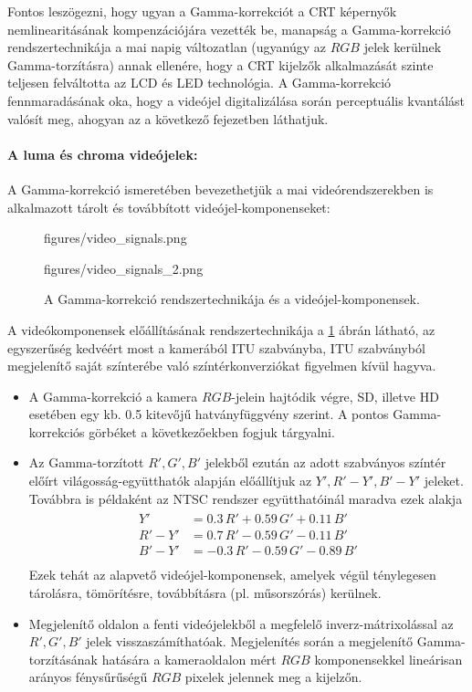 \hspace{3mm}
Fontos leszögezni, hogy ugyan a Gamma-korrekciót a CRT képernyők nemlinearitásának kompenzációjára vezették be, manapság a Gamma-korrekció rendszertechnikája a mai napig változatlan (ugyanúgy az $RGB$ jelek kerülnek Gamma-torzításra) annak ellenére, hogy a CRT kijelzők alkalmazását szinte teljesen felváltotta az LCD és LED technológia.
A Gamma-korrekció fennmaradásának oka, hogy a videójel digitalizálása során perceptuális kvantálást valósít meg, ahogyan az a következő fejezetben láthatjuk.

\paragraph{A luma és chroma videójelek:\\}
A Gamma-korrekció ismeretében bevezethetjük a mai videórendszerekben is alkalmazott tárolt és továbbított videójel-komponenseket:
\begin{figure}[]
	\centering
	\begin{overpic}[width = 0.53\columnwidth ]{figures/video_signals.png}
	\end{overpic}
	\hspace{2mm}
	\begin{overpic}[width = 0.44\columnwidth ]{figures/video_signals_2.png}
	\end{overpic}
	\caption{A Gamma-korrekció rendszertechnikája és a videójel-komponensek.}
	\label{Fig:gamma_system}  
\end{figure}
A videókomponensek előállításának rendszertechnikája a \ref{Fig:gamma_system} ábrán látható, az egyszerűség kedvéért most a kamerából ITU szabványba, ITU szabványból megjelenítő saját színterébe való színtérkonverziókat figyelmen kívül hagyva.
\begin{itemize}
\item A Gamma-korrekció a kamera $RGB$-jelein hajtódik végre, SD, illetve HD esetében egy kb. 0.5 kitevőjű hatványfüggvény szerint.
A pontos Gamma-korrekciós görbéket a következőekben fogjuk tárgyalni.
\item Az Gamma-torzított $R',G',B'$ jelekből ezután az adott szabványos színtér előírt világosság-együtthatók alapján előállítjuk az $Y', R'-Y', B'-Y'$ jeleket.
Továbbra is példaként az NTSC rendszer együtthatóinál maradva ezek alakja
\begin{align}
\begin{split}
Y' &= 0.3 \, R' + 0.59 \, G' + 0.11 \, B' \\
R'-Y' &= 0.7 \, R' - 0.59 \, G' - 0.11 \, B' \\
B'-Y' &= -0.3 \, R' - 0.59 \, G' - 0.89 \, B' \\
\end{split}
\end{align}
Ezek tehát az alapvető videójel-komponensek, amelyek végül ténylegesen tárolásra, tömörítésre, továbbításra (pl. műsorszórás) kerülnek.
\item Megjelenítő oldalon a fenti videójelekből a megfelelő inverz-mátrixolással az $R', G', B'$ jelek visszaszámíthatóak.
Megjelenítés során a megjelenítő Gamma-torzításának hatására a kameraoldalon mért $RGB$ komponensekkel lineárisan arányos fénysűrűségű $RGB$ pixelek jelennek meg a kijelzőn.
\end{itemize}
